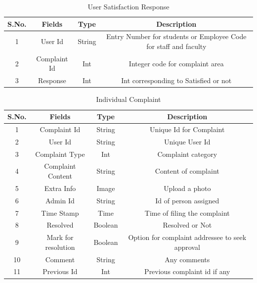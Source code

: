 \documentclass{article}
\begin{document}
\begin{table}[]
\centering
\caption{User Satisfaction Response}
\label{my-label}
\begin{tabular}{|c|c|c|c|}
\hline
\textbf{S.No.} & \textbf{Fields} & \textbf{Type} & \textbf{Description}                                             \\ \hline
1              & User Id         & String        & Entry Number for students or Employee Code for staff and faculty \\ \hline
2              & Complaint Id    & Int           & Integer code for complaint area                                  \\ \hline
3              & Response         & Int           & Int corresponding to Satisfied or not 				           \\ \hline
\end{tabular}
\end{table}



\begin{table}[]
\centering
\caption{Individual Complaint}
\label{my-label}
\begin{tabular}{|c|c|c|c|}
\hline
\textbf{S.No.} & \textbf{Fields}     & \textbf{Type} & \textbf{Description}                            \\ \hline
1              & Complaint Id        & String        & Unique Id for Complaint                         \\ \hline
2              & User Id             & String        & Unique User Id                                  \\ \hline
3              & Complaint Type      & Int           & Complaint category                              \\ \hline
4              & Complaint Content   & String        & Content of complaint                            \\ \hline
5              & Extra Info          & Image         & Upload a photo                                  \\ \hline
6              & Admin Id            & String        & Id of person assigned                           \\ \hline
7              & Time Stamp          & Time          & Time of filing the complaint                    \\ \hline
8              & Resolved            & Boolean       & Resolved or Not                                 \\ \hline
9              & Mark for resolution & Boolean       & Option for complaint addressee to seek approval \\ \hline
10             & Comment             & String        & Any comments                                    \\ \hline
11             & Previous Id         & Int           & Previous complaint id if any                    \\ \hline
\end{tabular}
\end{table}
\end{document}
